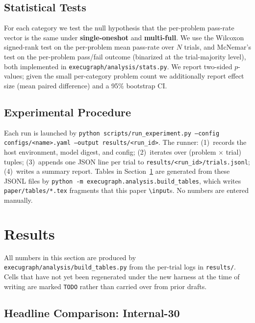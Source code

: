 \documentclass[journal]{IEEEtran}
\begin{document}
\subsection{Statistical Tests}\label{sec:stats}
For each category we test the null hypothesis that the per-problem pass-rate vector is the same under \textbf{single-oneshot} and \textbf{multi-full}. We use the Wilcoxon signed-rank test on the per-problem mean pass-rate over $N$ trials, and McNemar's test on the per-problem pass/fail outcome (binarized at the trial-majority level), both implemented in \texttt{execugraph/analysis/stats.py}. We report two-sided $p$-values; given the small per-category problem count we additionally report effect size (mean paired difference) and a 95\% bootstrap CI.

\subsection{Experimental Procedure}\label{sec:procedure}
Each run is launched by \texttt{python scripts/run\_experiment.py --config configs/<name>.yaml --output results/<run\_id>}. The runner: (1)~records the host environment, model digest, and config; (2)~iterates over (problem $\times$ trial) tuples; (3)~appends one JSON line per trial to \texttt{results/<run\_id>/trials.jsonl}; (4)~writes a summary report. Tables in Section~\ref{sec:results} are generated from these JSONL files by \texttt{python -m execugraph.analysis.build\_tables}, which writes \texttt{paper/tables/*.tex} fragments that this paper \texttt{\textbackslash input{}}s. No numbers are entered manually.


\section{Results}\label{sec:results}

All numbers in this section are produced by \texttt{execugraph/analysis/build\_tables.py} from the per-trial logs in \texttt{results/}. Cells that have not yet been regenerated under the new harness at the time of writing are marked \texttt{TODO} rather than carried over from prior drafts.

\FloatBarrier
\subsection{Headline Comparison: Internal-30}\label{sec:headline}
\end{document}
